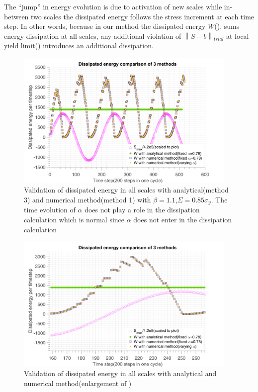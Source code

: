 The ``jump'' in energy evolution is due to activation of new scales while in-between two scales the dissipated energy follows the stress increment at each time step. In other words, because in our method the dissipated energy $W$(), sums energy dissipation at all scales, any additional violation of $\left\|S-b \right\|_{trial}$ at local yield limit() introduces an additional dissipation. 

\begin{figure}[!h]
\centering
\includegraphics[width=0.95\textwidth]{figures//W_3methods.png} 
\caption{Validation of dissipated energy in all scales with analytical(method 3) and numerical method(method 1) with $\beta=1.1$,$\Sigma=0.85\sigma_y$. The time evolution of $\alpha$ does not play a role in the dissipation calculation which is normal since $\alpha$ does not enter in the dissipation calculation }
\label{fig.W3methods}
\end{figure}
\begin{figure}[!h]
	\centering
	\includegraphics[width=0.95\textwidth]{figures//W_3methods_enlarge.png} 
	\caption{Validation of dissipated energy in all scales with analytical and numerical method(enlargement of )}
	\label{fig.W3methodsenlarge}
\end{figure}
